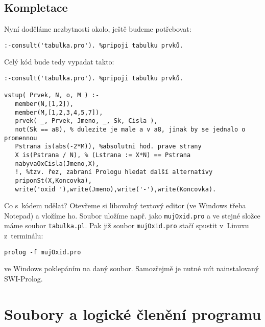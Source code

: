 \documentclass[a4paper]{article}
\begin{document}
\subsection{Kompletace}
Nyní doděláme nezbytnosti okolo, ještě budeme potřebovat:
\begin{verbatim}
:-consult('tabulka.pro'). %pripoji tabulku prvků.
\end{verbatim}
Celý kód bude tedy vypadat takto:
\begin{verbatim}
:-consult('tabulka.pro'). %pripoji tabulku prvků.

vstup( Prvek, N, o, M ) :-
   member(N,[1,2]),
   member(M,[1,2,3,4,5,7]),
   prvek( _, Prvek, Jmeno, _, Sk, Cisla ),
   not(Sk == a8), % dulezite je male a v a8, jinak by se jednalo o promennou
   Pstrana is(abs(-2*M)), %absolutni hod. prave strany
   X is(Pstrana / N), % (Lstrana := X*N) == Pstrana
   nabyvaOxCisla(Jmeno,X),
   !, %tzv. řez, zabraní Prologu hledat další alternativy
   priponSt(X,Koncovka), 
   write('oxid '),write(Jmeno),write('-'),write(Koncovka).
\end{verbatim}

Co s~kódem udělat? Otevřeme si libovolný textový editor (ve Windows třeba Notepad)
a vložíme ho. Soubor uložíme např. jako \texttt{mujOxid.pro} a ve stejné složce máme
soubor \texttt{tabulka.pl}. Pak již soubor \texttt{mujOxid.pro} stačí spustit v~Linuxu
z~terminálu:
\begin{verbatim}
prolog -f mujOxid.pro
\end{verbatim}
ve Windows poklepáním na daný soubor. Samozřejmě je nutné mít nainstalovaný SWI-Prolog.

\section{Soubory a logické členění programu}
\end{document}
